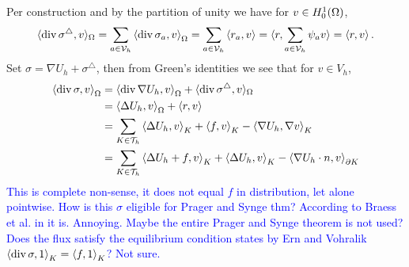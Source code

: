\documentclass[thesis.tex]{subfiles}
\begin{document}
Per construction and by the partition of unity we have for $v \in H_0^1(\Omega)$,
\[
  \langle \operatorname{div} \sigma^\triangle,v\rangle_{\Omega} = \sum_{a \in \mathcal{V}_h} \left \langle \operatorname{div} \sigma_a,v \right \rangle_\Omega = \sum_{a \in \mathcal{V}_h} \left \langle r_a,v \right \rangle = \langle r, \sum_{a \in \mathcal{V}_h} \psi_a v \rangle  = \left \langle r, v \right \rangle.
\]
Set $\sigma = \nabla U_h + \sigma^\triangle$, then from Green's identities we see that for $v \in V_h$,
\begin{align*}
  \left \langle \operatorname{div} \sigma, v \right \rangle_\Omega &=  \left \langle \operatorname{div} \nabla U_h, v \right \rangle_\Omega + \langle\operatorname{div} \sigma^\triangle, v\rangle_{\Omega}\\
  &= \left \langle \Delta U_h, v \right \rangle_\Omega + \left \langle r,v \right \rangle\\
  &= \sum_{K \in \mathcal{T}_h} \left \langle \Delta U_h,v \right \rangle_K + \left \langle f,v \right \rangle_K - \left \langle \nabla U_h, \nabla v \right \rangle_K\\
  &= \sum_{K \in \mathcal{T}_h} \left \langle \Delta U_h + f,v \right \rangle_K + \left \langle \Delta U_h, v \right \rangle_K - \left \langle \nabla U_h \cdot n, v \right \rangle_{\partial K}\\
\end{align*}
\textcolor{blue}{
  This is complete non-sense, it does not equal $f$ in distribution, let alone pointwise. How is this $\sigma$ eligible for Prager and Synge thm?  According to Braess et al. in \cite{braessequilrobust} it is. Annoying.
  Maybe the entire Prager and Synge theorem is not used? Does the flux satisfy the equilibrium condition states by Ern and Vohralik
  $\left \langle \operatorname{div} \sigma, 1 \right \rangle_K = \left \langle f, 1 \right \rangle_K$? Not sure.
}
\end{document}
